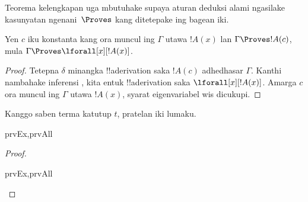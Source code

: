\documentclass[../../../include/open-logic-section]{subfiles}
\begin{document}


\begin{explain}
  Teorema kelengkapan uga mbutuhake supaya aturan deduksi alami
  ngasilake kasunyatan ngenani~$\Proves$ kang ditetepake ing bagean
  iki.
\end{explain}

\begin{thm}
 Yen $c$ iku konstanta kang ora
muncul ing $\Gamma$ utawa $!A(x)$ lan $\Gamma \Proves !A(c)$, mula
$\Gamma \Proves \lforall[x][!A(x)]$.
\end{thm}

\begin{proof}
Tetepna $\delta$ minangka !!a{derivation} saka $!A(c)$ adhedhasar $\Gamma$.
Kanthi nambahake inferensi \Intro{\lforall}, kita entuk
!!a{derivation} saka $\lforall[x][!A(x)]$. Amarga $c$ ora muncul ing
$\Gamma$ utawa $!A(x)$, syarat eigenvariabel wis dicukupi.
\end{proof}

\begin{prop}
Kanggo saben terma katutup $t$, pratelan iki lumaku.
\begin{tagenumerate}{prvEx,prvAll}

\end{tagenumerate}
\end{prop}

\begin{proof}
\begin{tagenumerate}{prvEx,prvAll}

\end{tagenumerate}
\end{proof}
\end{document}
